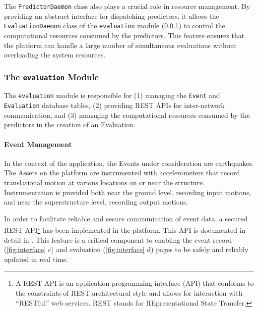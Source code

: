 The \texttt{PredictorDaemon} class also plays a crucial role in resource management. 
By providing an abstract interface for dispatching predictors, it allows the \texttt{EvaluationDaemon} class of the \texttt{evaluation} module (\cref{sec:evaluation-module}) to control the computational resources consumed by the predictors. 
This feature ensures that the platform can handle a large number of simultaneous evaluations without overloading the system resources.

\subsubsection{The \texttt{evaluation} Module}\label{sec:evaluation-module}

The \texttt{evaluation} module is responsible for (1) managing the \texttt{Event} and \texttt{Evaluation} database tables, (2) providing REST APIs for inter-network communication, and (3) managing the computational resources consumed by the predictors in the creation of an Evaluation.

\paragraph{Event Management}

In the context of the \BRACE{} application, the Events under consideration
are earthquakes. 
The Assets on the \gls{platform} are instrumented with accelerometers that record translational motion at various locations on or near the structure. 
Instrumentation is provided both near the ground level, recording input motions, and near the superstructure level, recording output motions.

In order to facilitate reliable and secure communication of \gls{event} data, a secured REST API{\footnote{A REST API is an application programming interface (API) that conforms to the constraints of REST architectural style and allows for interaction with ``RESTful'' web services. REST stands for REpresentational State Transfer.}} has been implemented in the \gls{platform}. 
This API is documented in detail in \cite{chern2024brace2}. 
This feature is a critical component to enabling the event record (\cref{fig:interface} c) and evaluation (\cref{fig:interface} d) pages to be safely and reliably updated in real time.

